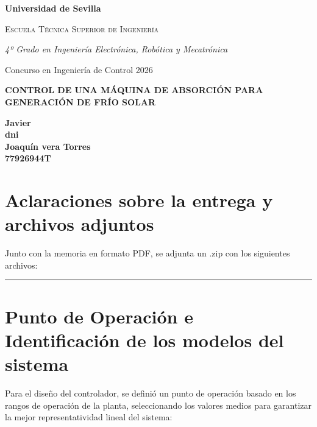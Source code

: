 \documentclass[12pt,a4paper]{article}
\begin{document}
	
	\begin{titlepage}
		\centering
		\vspace*{1cm}
		{\bfseries\LARGE Universidad de Sevilla \par}
		\vspace{0.5cm}
		{\scshape\Large Escuela Técnica Superior de Ingeniería \par}
		\vspace{2cm}
		{\itshape\Large 4º Grado en Ingeniería Electrónica, Robótica y Mecatrónica \par}
		\vspace{1cm}
		{\Large Concurso en
			Ingeniería de Control
			2026 \par}
		\vfill
		{\huge\bfseries CONTROL DE UNA MÁQUINA DE
			ABSORCIÓN PARA GENERACIÓN DE
			FRÍO SOLAR
			 \par}
		\vspace{0.5cm}
		\vfill
		
		\begin{flushright}
			\large
			\textbf{Javier  } \\
			\textbf{dni} \\
			\textbf{Joaquín vera Torres} \\
			\textbf{77926944T} \\
			\vspace{0.5cm}
		\end{flushright}
	\end{titlepage}
	
	\newpage
	\section*{Aclaraciones sobre la entrega y archivos adjuntos}
	
	Junto con la  memoria en formato PDF, se adjunta un .zip con los siguientes archivos: 
	
	
	
	\vspace{0.5cm}
	\hrule
	\vspace{0.5cm}
	
	\newpage
	
	\tableofcontents
	\newpage
	
	\section{Punto de Operación e Identificación de los modelos del sistema}
	
	Para el diseño del controlador, se definió un punto de operación basado en los rangos de operación de la planta, seleccionando los valores medios para garantizar la mejor representatividad lineal del sistema:
	
\end{document}
